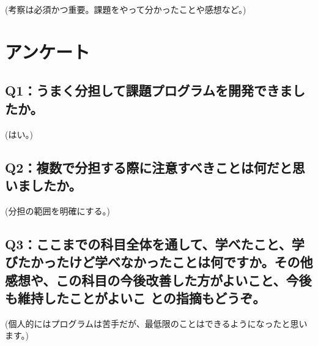 \documentclass[12pt,a4j]{jarticle}
\begin{document}
(考察は必須かつ重要。課題をやって分かったことや感想など。)

\section{アンケート}

\subsection{Q1：うまく分担して課題プログラムを開発できましたか。}

(はい。)

\subsection{Q2：複数で分担する際に注意すべきことは何だと思いましたか。}

(分担の範囲を明確にする。)

\subsection{Q3：ここまでの科目全体を通して、学べたこと、学びたかったけど学べなかったことは何ですか。その他感想や、この科目の今後改善した方がよいこと、今後も維持したことがよいこ との指摘もどうぞ。}

(個人的にはプログラムは苦手だが、最低限のことはできるようになったと思います。)
\end{document}
